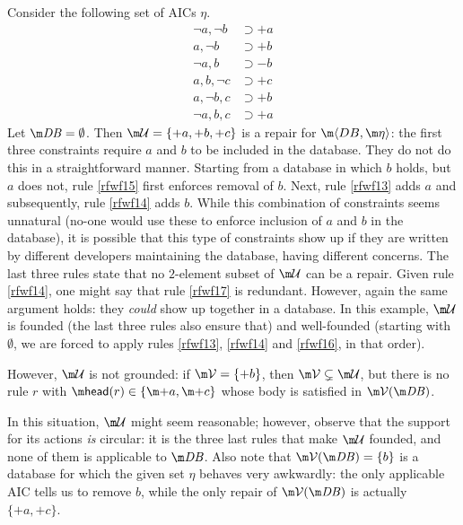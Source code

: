 \begin{example}\label{ex:founded:well-founded}
  Consider the following set of AICs $\eta$.
  \begin{align}
    \neg a,\neg b&\supset{+a} \label{rfwf13} \\
    a,\neg b&\supset{+b} \label{rfwf14} \\
    \neg a,b&\supset{-b} \label{rfwf15} \\
    a,b,\neg c&\supset{+c} \label{rfwf16} \\
    a,\neg b,c&\supset{+b} \label{rfwf17} \\
    \neg a,b,c&\supset{+a}\label{rfwf18}
  \end{align}
  Let $\db=\emptyset$.
  Then $\UU=\{{+a},{+b},{+c}\}$ is a repair for $\fulldb$: the first three constraints require ${a}$ and ${b}$ to be included in the database. 
  They do not do this in a straightforward manner. Starting from a database in which $b$ holds, but $a$ does not, rule \eqref{rfwf15} first enforces removal of $b$. 
  Next, rule \eqref{rfwf13} adds $a$ and subsequently, rule \eqref{rfwf14} adds $b$. 
  While this combination of constraints seems unnatural (no-one would use these to enforce inclusion of $a$ and $b$ in the database), it is possible that this type of constraints show up if they are written by different developers maintaining the database, having different concerns. 
  The last three rules state that no $2$-element subset of $\UU$ can be a repair. Given rule \eqref{rfwf14}, one might say that rule \eqref{rfwf17} is redundant. However, again the same argument holds: they \emph{could} show up together in a database.
  In this example, $\UU$ is founded (the last three rules also ensure that) and well-founded (starting with $\emptyset$, we are forced to apply rules \ref{rfwf13}, \ref{rfwf14} and \ref{rfwf16}, in that order).

  However, $\UU$ is not grounded: if $\VV=\{{+b}\}$, then $\VV\subsetneq\UU$, but there is no rule $r$ with $\head(r)\in\{\add a, \add c\} $ whose body is satisfied in $\VV(\db)$. %
\end{example}
In this situation, $\UU$ might seem reasonable; however, observe that the support for its actions \emph{is} circular: it is the three last rules that make $\UU$ founded, and none of them is applicable to $\db$.
Also note that $\VV(\db)=\{b\}$ is a database for which the given set $\eta$ behaves very awkwardly: the only applicable AIC tells us to remove $b$, while the only repair of $\VV(\db)$ is actually $\{{+a},{+c}\}$.

